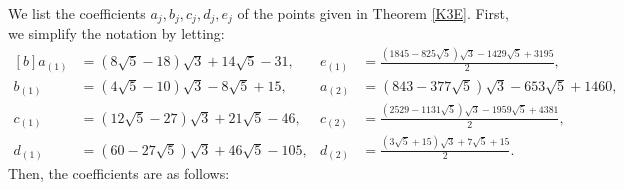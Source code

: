 \documentclass[11pt]{amsart}
\begin{document}
We list the coefficients $a_j, b_j, c_j, d_j, e_j$ of the points given in Theorem \ref{K3E}.
First, we  simplify the notation by letting:
{\small $$	\begin{aligned}[b]
		a_{(1)}&= (8 \sqrt{5} -18 ) \sqrt{3} +14 \sqrt{5}- 31, &  e_{(1)}&=\frac{(1845-825 \sqrt{5})\sqrt{3} - 1429 \sqrt{5} + 3195}{2}, \\
		b_{(1)}&= (4 \sqrt{5} -10) \sqrt{3} -8 \sqrt{5}+15,  & a_{(2)}&=(843-377 \sqrt{5}) \sqrt{3} - 653 \sqrt{5} +1460,   \\
		c_{(1)}&= (12 \sqrt{5} -27 ) \sqrt{3} +21 \sqrt{5}- 46,  & c_{(2)}&=\frac{(2529-1131 \sqrt{5}) \sqrt{3} - 1959 \sqrt{5}+4381}{2}, \\
		d_{(1)}&= (60-27 \sqrt{5}) \sqrt{3} + 46 \sqrt{5}- 105, & d_{(2)}&=\frac{(3 \sqrt{5} + 15 )\sqrt{3} + 7 \sqrt{5}+ 15}{2}. 
	\end{aligned}$$}
Then,	the coefficients are as follows:
\end{document}
